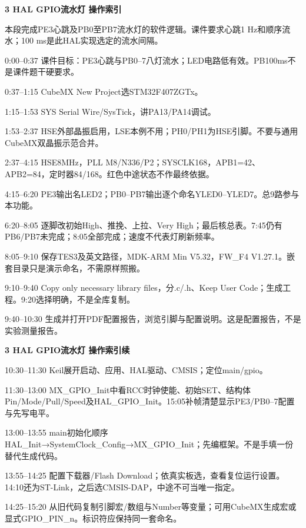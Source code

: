 \documentclass[10pt,a4paper]{article}
\newcommand{\qtitle}[1]{{\Large\bfseries #1}\par\vspace{4pt}}
\begin{document}
\clearpage
{}
\qtitle{3 HAL GPIO流水灯 操作索引}
本段完成PE3心跳及PB0至PB7流水灯的软件逻辑。课件要求心跳1 Hz和顺序流水；100 ms是此HAL实现选定的流水间隔。

0:00–0:37  课件目标：PE3心跳与PB0–7八灯流水；LED电路低有效。PB100ms不是课件题干硬要求。

0:37–1:15  CubeMX New Project选STM32F407ZGTx。

1:15–1:53  SYS Serial Wire/\allowbreak{}SysTick，讲PA13/\allowbreak{}PA14调试。

1:53–2:37  HSE外部晶振启用，LSE本例不用；PH0/\allowbreak{}PH1为HSE引脚。不要与通用CubeMX双晶振示范合并。

2:37–4:15  HSE8MHz，PLL M8/\allowbreak{}N336/\allowbreak{}P2；SYSCLK168，APB1=42、APB2=84，定时器84/\allowbreak{}168。红色中途状态不作最终依据。

4:15–6:20  PE3输出名LED2；PB0–PB7输出逐个命名YLED0–YLED7。总9路参与本功能。

6:20–8:05  逐脚改初始High、推挽、上拉、Very High；最后核总表。7:45仍有PB6/\allowbreak{}PB7未完成；8:05全部完成；速度不代表灯刷新频率。

8:05–9:10  保存TES3及英文路径，MDK-ARM Min V5.32，FW\_\allowbreak{}F4 V1.27.1。嵌套目录只是演示命名，不需原样照搬。

9:10–9:40  Copy only necessary library files，分.c/\allowbreak{}.h、Keep User Code；生成工程。9:20选择明确，不是全库复制。

9:40–10:30  生成并打开PDF配置报告，浏览引脚与配置说明。这是配置报告，不是实验测量报告。


\clearpage
{}
\qtitle{3 HAL GPIO流水灯 操作索引续}
10:30–11:30  Keil展开启动、应用、HAL驱动、CMSIS；定位main/\allowbreak{}gpio。

11:30–13:00  MX\_\allowbreak{}GPIO\_\allowbreak{}Init中看RCC时钟使能、初始SET、结构体Pin/\allowbreak{}Mode/\allowbreak{}Pull/\allowbreak{}Speed及HAL\_\allowbreak{}GPIO\_\allowbreak{}Init。15:05补帧清楚显示PE3/\allowbreak{}PB0–7配置与先写电平。

13:00–13:55  main初始化顺序HAL\_\allowbreak{}Init→SystemClock\_\allowbreak{}Config→MX\_\allowbreak{}GPIO\_\allowbreak{}Init；先编框架。不是手填一份替代生成代码。

13:55–14:25  配置下载器/\allowbreak{}Flash Download；依真实板选，查看复位运行设置。14:10还为ST-Link，之后选CMSIS-DAP，中途不可当唯一指定。

14:25–15:20  从旧代码复制引脚宏/\allowbreak{}数组与Number等变量；可用CubeMX生成宏或显式GPIO\_\allowbreak{}PIN\_\allowbreak{}n。标识符应保持同一套命名。
\end{document}
